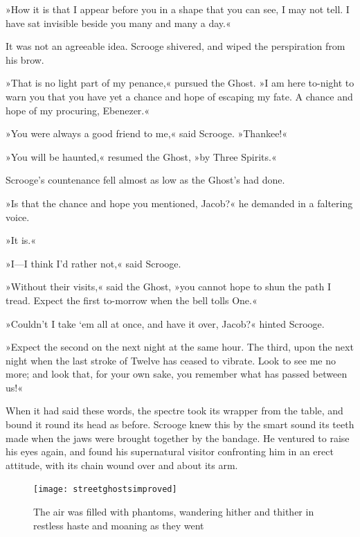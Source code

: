 »How it is that I appear before you in a shape that you can see, I may not tell. I have sat invisible beside you many and many a day.«

It was not an agreeable idea. Scrooge shivered, and wiped the perspiration from his brow.

»That is no light part of my penance,« pursued the Ghost. »I am here to-night to warn you that you have yet a chance and hope of escaping my fate. A chance and hope of my procuring, Ebenezer.«

»You were always a good friend to me,« said Scrooge. »Thankee!«

»You will be haunted,« resumed the Ghost, »by Three Spirits.«




Scrooge's countenance fell almost as low as the Ghost's had done.

»Is that the chance and hope you mentioned, Jacob?« he demanded in a faltering voice.

»It is.«

»I—I think I'd rather not,« said Scrooge.

»Without their visits,« said the Ghost, »you cannot hope to shun the path I tread. Expect the first to-morrow when the bell tolls One.«

»Couldn't I take `em all at once, and have it over, Jacob?« hinted Scrooge.

»Expect the second on the next night at the same hour. The third, upon the next night when the last stroke of Twelve has ceased to vibrate. Look to see me no more; and look that, for your own sake, you remember what has passed between us!«

When it had said these words, the spectre took its wrapper from the table, and bound it round its head as before. Scrooge knew this by the smart sound its teeth made when the jaws were brought together by the bandage. He ventured to raise his eyes again, and found his supernatural visitor confronting him in an erect attitude, with its chain wound over and about its arm.

\begin{figure}[p]
\begin{minipage}[c]{\textwidth}
\texttt{[image: streetghostsimproved]}
\caption[\textbf{The air was filled with phantoms}]{The air was filled with phantoms, wandering hither and thither in restless haste and moaning as they went}
\end{minipage}
\end{figure}


